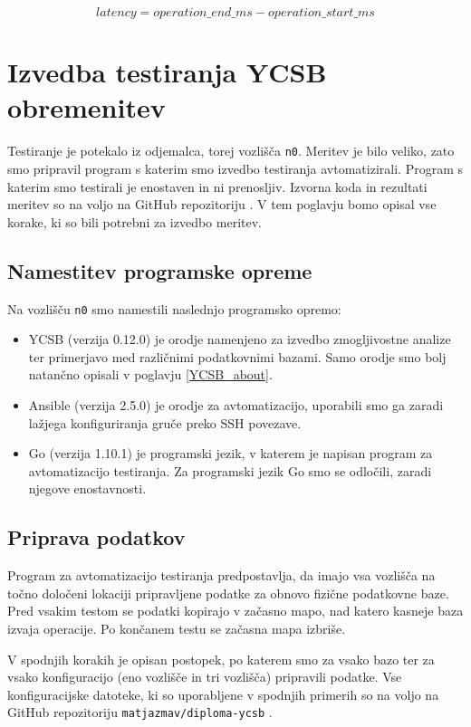 \documentclass[a4paper, 12pt]{book}
\begin{document}
\begin{equation} \label{eq:latency}
latency = operation\_end\_ms - operation\_start\_ms
\end{equation}

\section{Izvedba testiranja YCSB obremenitev}
\label{YCSB_benchmarking_steps}
Testiranje je potekalo iz odjemalca, torej vozlišča \texttt{n0}. Meritev je bilo veliko, zato smo pripravil program s katerim smo izvedbo testiranja avtomatizirali. Program s katerim smo testirali je enostaven in ni prenosljiv. Izvorna koda in rezultati meritev so na voljo na GitHub repozitoriju \cite{matjazmav/diploma-ycsb}. V tem poglavju bomo opisal vse korake, ki so bili potrebni za izvedbo meritev.

\subsection{Namestitev programske opreme}
Na vozlišču \texttt{n0} smo namestili naslednjo programsko opremo:
\begin{itemize}
    \item YCSB (verzija 0.12.0) \cite{brianfrankcooper/YCSB} je orodje namenjeno za izvedbo zmogljivostne analize ter primerjavo med različnimi podatkovnimi bazami. Samo orodje smo bolj natančno opisali v poglavju \ref{YCSB_about}.
    \item Ansible (verzija 2.5.0) \cite{Ansible} je orodje za avtomatizacijo, uporabili smo ga zaradi lažjega konfiguriranja gruče preko SSH povezave.
    \item Go (verzija 1.10.1) \cite{Golang} je programski jezik, v katerem je napisan program za avtomatizacijo testiranja. Za programski jezik Go smo se odločili, zaradi njegove enostavnosti.
\end{itemize} 

\subsection{Priprava podatkov}
\label{benchmarking-prepare-data}
Program za avtomatizacijo testiranja predpostavlja, da imajo vsa vozlišča na točno določeni lokaciji pripravljene podatke za obnovo fizične podatkovne baze. Pred vsakim testom se podatki kopirajo v začasno mapo, nad katero kasneje baza izvaja operacije. Po končanem testu se začasna mapa izbriše.

V spodnjih korakih je opisan postopek, po katerem smo za vsako bazo ter za vsako konfiguracijo (eno vozlišče in tri vozlišča) pripravili podatke. Vse konfiguracijske datoteke, ki so uporabljene v spodnjih primerih so na voljo na GitHub repozitoriju \texttt{matjazmav/diploma-ycsb} \cite{matjazmav/diploma-ycsb}.
\end{document}
